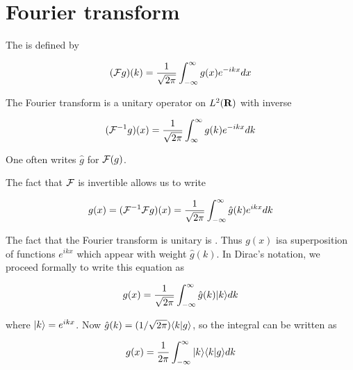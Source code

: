 
\begin{mathmacro}
\newcommand{\bra}[0]{\langle}
\newcommand{\ket}[0]{\rangle}
\newcommand{\caF}[0]{\mathcal{F}}
\newcommand{\boR}[0]{\bf{R}}
\end{mathmacro}

\setcounter{section}{9}

\section{Fourier transform}


\innertableofcontents

The  is defined by

\begin{equation}
(\caF g )(k) = \frac{1}{\sqrt{2\pi}} \int_{-\infty}^\infty g(x) e^{-ikx} dx
\end{equation}

The Fourier transform is a unitary operator on $L^2(\boR )$ with inverse

\begin{equation}
(\caF^{-1} g)(x) =  \frac{1}{\sqrt{2\pi}} \int_{\infty}^\infty g(k) e^{-ikx} dk
\end{equation}

One often writes $\hat g$ for $\caF(g)$.

The fact that $\caF$ is invertible allows us to write

\begin{equation}
g(x) = (\caF^{-1} \caF g)(x) =  \frac{1}{\sqrt{2\pi}}  \int_{-\infty}^\infty \hat g(k)  e^{ikx} dk
\end{equation}

The fact that the Fourier transform is unitary is .  Thus $g(x)$
isa superposition of  functions $e^{ikx}$ which appear with weight $\hat g(k)$.  In Dirac's notation, we proceed formally to write this equation as

\begin{equation}
g(x)  = \frac{1}{\sqrt{2\pi}} \int_{-\infty}^\infty \hat g(k) | k \ket dk
\end{equation}

where $| k \ket = e^{ikx}$. Now $\hat g(k) = (1/\sqrt{2\pi} )\bra k | g \ket$, so the integral can be written as

\begin{equation}
g(x)  = \frac{1}{2\pi} \int_{-\infty}^\infty  | k \ket \bra k | g \ket dk
\end{equation}


